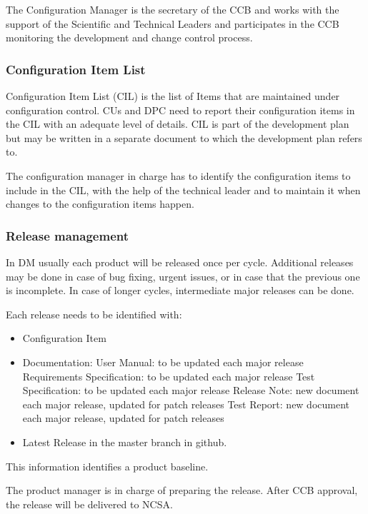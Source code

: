The Configuration Manager is the secretary of the CCB and 
works with the support of the Scientific and Technical Leaders 
and participates in the CCB monitoring the development 
and change control process.



\subsubsection{Configuration Item List}
Configuration Item List (CIL) is the list of Items that are maintained under configuration control.
CUs and DPC need to report their configuration items in the CIL with an adequate level of details.
CIL is part of the development plan but may be written 
in a separate document to which the development plan refers to.

The configuration manager in charge has to identify the configuration items to include in the CIL, 
with the help of the technical leader and to maintain it when changes to the configuration items happen.


\subsubsection{Release management\label{sect:relMng}}
In DM usually each product will be released once per cycle. 
Additional releases may be done in case of bug fixing, urgent issues, or in case that the previous one is incomplete.
In case of longer cycles, intermediate major releases can be done.

Each release needs to be identified with:

\begin{itemize}
\item Configuration Item
\item Documentation:
\subitem User Manual: to be updated each major release
\subitem Requirements Specification: to be updated each major release
\subitem Test Specification: to be updated each major release
\subitem Release Note: new document each major release, updated for patch releases
\subitem Test Report: new document each major release, updated for patch releases
\item Latest Release in the master branch in github.
\end{itemize}
This information identifies a product baseline.

The product manager  is in charge of preparing the release.
After CCB approval, the release will be delivered to NCSA.

